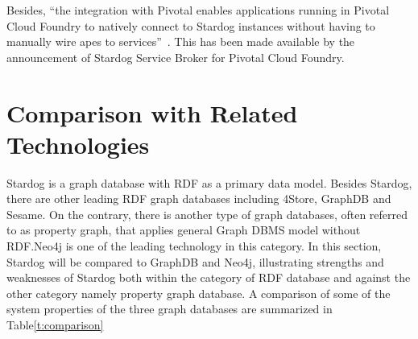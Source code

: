 		Besides, ``the integration with Pivotal enables applications running in 
		Pivotal Cloud Foundry to natively connect to Stardog instances without 
		having to manually wire apes to 
		services''~\cite{hid-sp18-405-blog-stardog-pcf}. This has been made 
		available by the announcement of Stardog Service Broker for Pivotal 
		Cloud Foundry.

\section{Comparison with Related Technologies}
\label{s:comp}
	Stardog is a graph database with RDF as a primary data model. Besides 
	Stardog, there are other leading RDF graph databases including 4Store, 
	GraphDB and Sesame. On the contrary, there is another type of graph 
	databases, often referred to as property graph, that applies general Graph 
	DBMS model without RDF.\@ Neo4j is one of the leading technology in this 
	category. In this section, Stardog will be compared to GraphDB and Neo4j, 
	illustrating strengths and weaknesses of Stardog both within the category 
	of RDF database and against the other category namely property graph 
	database. A comparison of some of the system properties of the three 
	graph databases are summarized in 
	Table\ref{t:comparison}

	\begin{table}[htb]
		\centering
		\caption{System Properties Comparison GraphDB vs.\ Neo4j vs.\ 
		Stardog~\cite{hid-sp18-405-www-stardog-dbengines-neo4j}~\cite{hid-sp18-405-www-stardog-dbengines-graphdb}}\label{t:comparison}
	\end{table}


